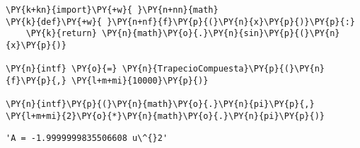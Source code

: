 \begin{example}
\begin{tcolorbox}[breakable, size=fbox, boxrule=1pt, pad at break*=1mm,colback=cellbackground, colframe=cellborder]
\begin{Verbatim}[commandchars=\\\{\}]
\PY{k+kn}{import}\PY{+w}{ }\PY{n+nn}{math}
\PY{k}{def}\PY{+w}{ }\PY{n+nf}{f}\PY{p}{(}\PY{n}{x}\PY{p}{)}\PY{p}{:}
    \PY{k}{return} \PY{n}{math}\PY{o}{.}\PY{n}{sin}\PY{p}{(}\PY{n}{x}\PY{p}{)}

\PY{n}{intf} \PY{o}{=} \PY{n}{TrapecioCompuesta}\PY{p}{(}\PY{n}{f}\PY{p}{,} \PY{l+m+mi}{10000}\PY{p}{)}

\PY{n}{intf}\PY{p}{(}\PY{n}{math}\PY{o}{.}\PY{n}{pi}\PY{p}{,} \PY{l+m+mi}{2}\PY{o}{*}\PY{n}{math}\PY{o}{.}\PY{n}{pi}\PY{p}{)}
\end{Verbatim}
\end{tcolorbox}

\begin{tcolorbox}[breakable, size=fbox, boxrule=.5pt, pad at break*=1mm, opacityfill=0]
\begin{Verbatim}[commandchars=\\\{\}]
'A = -1.9999999835506608 u\^{}2'
\end{Verbatim}
\end{tcolorbox}
\end{example}
        
